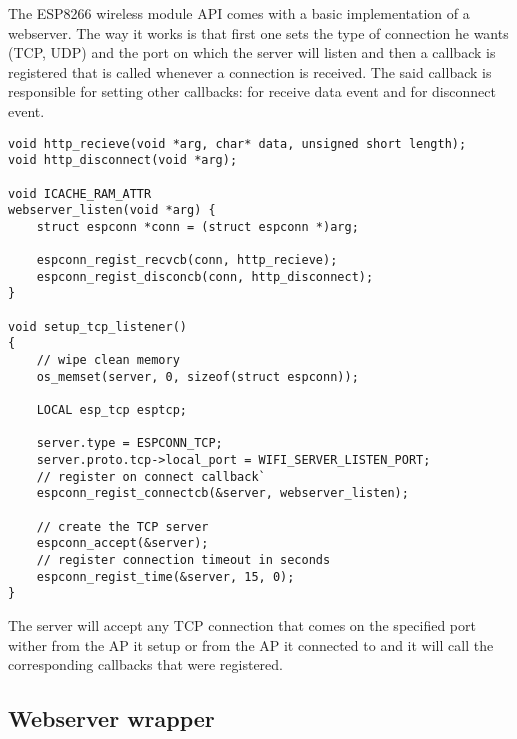 The ESP8266 wireless module API comes with a basic implementation of a webserver. The way it works is that
first one sets the type of connection he wants (TCP, UDP) and the port on which the server will listen and
then a callback is registered that is called whenever a connection is received. The said callback is
responsible for setting other callbacks: for receive data event and for disconnect event.

\begin{lstlisting}[frame=single]
void http_recieve(void *arg, char* data, unsigned short length);
void http_disconnect(void *arg);

void ICACHE_RAM_ATTR
webserver_listen(void *arg) {
    struct espconn *conn = (struct espconn *)arg;

    espconn_regist_recvcb(conn, http_recieve);
    espconn_regist_disconcb(conn, http_disconnect);
}

void setup_tcp_listener()
{
    // wipe clean memory
    os_memset(server, 0, sizeof(struct espconn));

    LOCAL esp_tcp esptcp;

    server.type = ESPCONN_TCP;
    server.proto.tcp->local_port = WIFI_SERVER_LISTEN_PORT;
    // register on connect callback`
    espconn_regist_connectcb(&server, webserver_listen);

    // create the TCP server
    espconn_accept(&server);
    // register connection timeout in seconds
    espconn_regist_time(&server, 15, 0);
}
\end{lstlisting}

The server will accept any TCP connection that comes on the specified port wither from the AP it setup or from
the AP it connected to and it will call the corresponding callbacks that were registered.

\subsection{Webserver wrapper}

